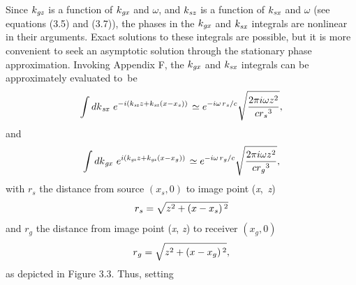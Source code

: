 Since \(k_{\text{\textit{gz}}}\) is a function of \(k_{\text{\textit{gx}}}\) and $\omega $, and \(k_{\text{\textit{sz}}}\) is a function of \(k_{\text{\textit{sx}}}\)
and $\omega $ (see equations (3.5) and (3.7)), the phases in the \(k_{\text{\textit{gx}}}\) and \(k_{\text{\textit{sx}}}\) integrals are nonlinear
in their arguments. Exact solutions to these integrals are possible, but it is more convenient to seek an asymptotic solution through the stationary
phase approximation. Invoking Appendix F, the \(k_{\text{\textit{gx}}}\) and \(k_{\text{\textit{sx}}}\) integrals can be approximately evaluated
to~be
\begin{equation}\int d\text{\textit{$k$}}_{\text{\textit{sx}}}\text{  }e^{-i\left(\text{\textit{$k$}}_{\text{\textit{sz}}}\text{\textit{$z$}}+\text{\textit{$k$}}_{\text{\textit{sx}}}\left(\text{\textit{$x$}}\text{\textit{$-$}}\text{\textit{$x$}}_{\text{\textit{$s$}}}\right)\text{\textit{$)$}}\right.}\simeq
e^{-i \omega  \left.\text{\textit{$r$}}_{\text{\textit{$s$}}}\right/\text{\textit{$c$}}}\sqrt{\frac{2\pi  i \omega  \text{\textit{$z$}}^2}{\text{\textit{$c$}}\text{\textit{$
$}}\text{\textit{$r$}}_{\text{\textit{$s$}}}{}^3}},\end{equation}
and
\begin{equation}\int d\text{\textit{$k$}}_{\text{\textit{gx}}}\text{  }e^{i\left(\text{\textit{$k$}}_{\text{\textit{gz}}}\text{\textit{$z$}}+\text{\textit{$k$}}_{\text{\textit{gx}}}\left(\text{\textit{$x$}}\text{\textit{$-$}}\text{\textit{$x$}}_{\text{\textit{$g$}}}\right)\text{\textit{$)$}}\right.}\simeq
e^{-i \omega  \left.\text{\textit{$r$}}_{\text{\textit{$g$}}}\right/\text{\textit{$c$}}}\sqrt{\frac{2\pi  i \omega  \text{\textit{$z$}}^2}{\text{\textit{$c$}}\text{\textit{$
$}}\text{\textit{$r$}}_{\text{\textit{$g$}}}{}^3}},\end{equation}
with \(r_s\) the distance from source \(\left(x_s,0\right)\) to image point (\textit{x},\, \textit{z})
\begin{equation}\text{\textit{$r$}}_{\text{\textit{$s$}}}=\sqrt{\text{\textit{$z$}}^2+\left(\text{\textit{$x$}}-\text{\textit{$x$}}_{\text{\textit{$s$}}}\right){}^2}\end{equation}
and \(r_g\) the distance from image point (\textit{x}, \textit{z}) to receiver \(\left(x_g,0\right)\)
\begin{equation}\text{\textit{$r$}}_{\text{\textit{$g$}}}=\sqrt{\text{\textit{$z$}}^2+\left(\text{\textit{$x$}}-\text{\textit{$x$}}_{\text{\textit{$g$}}}\right){}^2},\end{equation}
as depicted in Figure 3.3. Thus, setting
